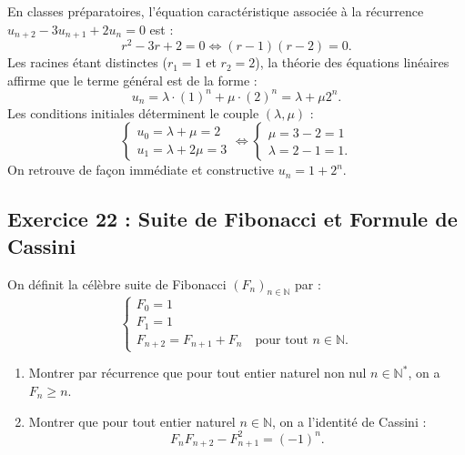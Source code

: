 \documentclass[11pt,a4paper]{article}
\newcommand{\N}{\mathbb{N}}
\begin{document}
\begin{remarquabox}
En classes préparatoires, l'équation caractéristique associée à la récurrence $u_{n+2} - 3u_{n+1} + 2u_n = 0$ est :
\[
r^2 - 3r + 2 = 0 \iff (r - 1)(r - 2) = 0.
\]
Les racines étant distinctes ($r_1 = 1$ et $r_2 = 2$), la théorie des équations linéaires affirme que le terme général est de la forme :
\[
u_n = \lambda \cdot (1)^n + \mu \cdot (2)^n = \lambda + \mu 2^n.
\]
Les conditions initiales déterminent le couple $(\lambda, \mu)$ :
\[
\begin{cases}
u_0 = \lambda + \mu = 2 \\
u_1 = \lambda + 2\mu = 3
\end{cases}
\iff
\begin{cases}
\mu = 3 - 2 = 1 \\
\lambda = 2 - 1 = 1.
\end{cases}
\]
On retrouve de façon immédiate et constructive $u_n = 1 + 2^n$.
\end{remarquabox}

\subsection*{Exercice 22 : Suite de Fibonacci et Formule de Cassini}

On définit la célèbre suite de Fibonacci $(F_n)_{n \in \N}$ par :
\[
\begin{cases}
F_0 = 1 \\
F_1 = 1 \\
F_{n+2} = F_{n+1} + F_n \quad \text{pour tout } n \in \N.
\end{cases}
\]
\begin{enumerate}
    \item Montrer par récurrence que pour tout entier naturel non nul $n \in \N^*$, on a $F_n \ge n$.
    \item Montrer que pour tout entier naturel $n \in \N$, on a l'identité de Cassini :
    \[
    F_n F_{n+2} - F_{n+1}^2 = (-1)^n.
    \]
\end{enumerate}
\end{document}
